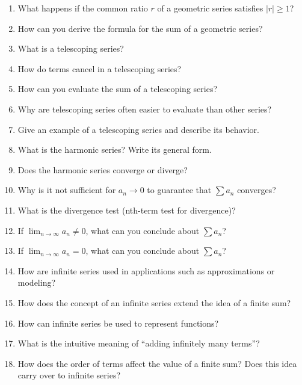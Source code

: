 \begin{enumerate}
\item What happens if the common ratio $r$ of a geometric series satisfies $|r| \geq 1$?

\item How can you derive the formula for the sum of a geometric series?

\item What is a telescoping series?

\item How do terms cancel in a telescoping series?

\item How can you evaluate the sum of a telescoping series?

\item Why are telescoping series often easier to evaluate than other series?

\item Give an example of a telescoping series and describe its behavior.

\item What is the harmonic series? Write its general form.

\item Does the harmonic series converge or diverge?

\item Why is it not sufficient for $a_n \to 0$ to guarantee that $\sum a_n$ converges?

\item What is the divergence test (nth-term test for divergence)?

\item If $\lim_{n \to \infty} a_n \neq 0$, what can you conclude about $\sum a_n$?

\item If $\lim_{n \to \infty} a_n = 0$, what can you conclude about $\sum a_n$?

\item How are infinite series used in applications such as approximations or modeling?

\item How does the concept of an infinite series extend the idea of a finite sum?

\item How can infinite series be used to represent functions?

\item What is the intuitive meaning of “adding infinitely many terms”?

\item How does the order of terms affect the value of a finite sum? Does this idea carry over to infinite series?

\end{enumerate}
